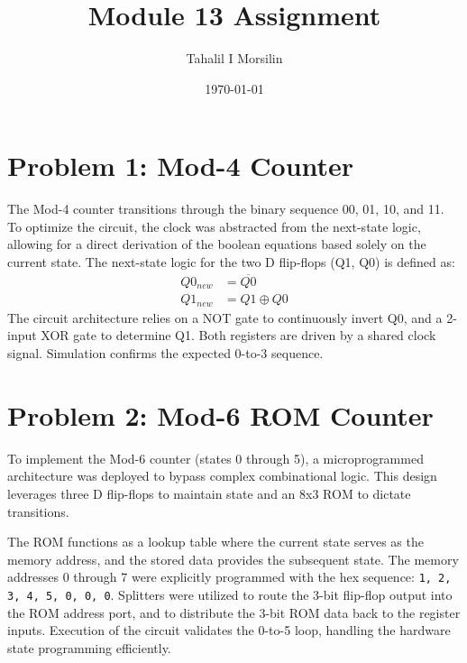 \documentclass{article}
\title{Module 13 Assignment}
\author{Tahalil I Morsilin}
\date{\today}
\begin{document}
\maketitle

\section*{Problem 1: Mod-4 Counter}
The Mod-4 counter transitions through the binary sequence 00, 01, 10, and 11. To optimize the circuit, the clock was abstracted from the next-state logic, allowing for a direct derivation of the boolean equations based solely on the current state. The next-state logic for the two D flip-flops (Q1, Q0) is defined as:
\begin{align*}
    Q0_{new} &= \overline{Q0} \\
    Q1_{new} &= Q1 \oplus Q0
\end{align*}
The circuit architecture relies on a NOT gate to continuously invert Q0, and a 2-input XOR gate to determine Q1. Both registers are driven by a shared clock signal. Simulation confirms the expected 0-to-3 sequence.

\section*{Problem 2: Mod-6 ROM Counter}
To implement the Mod-6 counter (states 0 through 5), a microprogrammed architecture was deployed to bypass complex combinational logic. This design leverages three D flip-flops to maintain state and an 8x3 ROM to dictate transitions. 

The ROM functions as a lookup table where the current state serves as the memory address, and the stored data provides the subsequent state. The memory addresses 0 through 7 were explicitly programmed with the hex sequence: \texttt{1, 2, 3, 4, 5, 0, 0, 0}. Splitters were utilized to route the 3-bit flip-flop output into the ROM address port, and to distribute the 3-bit ROM data back to the register inputs. Execution of the circuit validates the 0-to-5 loop, handling the hardware state programming efficiently.
\end{document}

